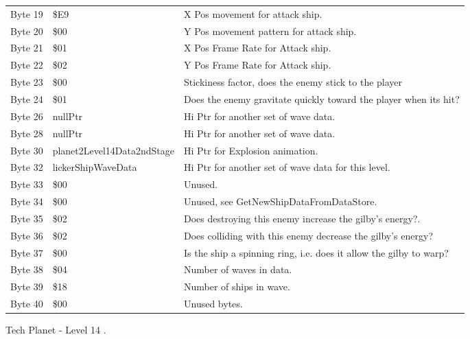 \begin{figure}[H]
{\begin{adjustbox}{width=12cm}
\begin{tabular}{lll}
 Byte 19 & \$E9                        & X Pos movement for attack ship.                                    \\
 Byte 20 & \$00                        & Y Pos movement pattern for attack ship.                            \\
 Byte 21 & \$01                        & X Pos Frame Rate for Attack ship.                                  \\
 Byte 22 & \$02                        & Y Pos Frame Rate for Attack ship.                                  \\
 Byte 23 & \$00                        & Stickiness factor, does the enemy stick to the player              \\
 Byte 24 & \$01                        & Does the enemy gravitate quickly toward the player when its hit?   \\
 Byte 26 & nullPtr                    & Hi Ptr for another set of wave data.                               \\
 Byte 28 & nullPtr                    & Hi Ptr for another set of wave data.                               \\
 Byte 30 & planet2Level14Data2ndStage & Hi Ptr for Explosion animation.                                    \\
 Byte 32 & lickerShipWaveData         & Hi Ptr for another set of wave data for this level.                \\
 Byte 33 & \$00                        & Unused.                                                            \\
 Byte 34 & \$00                        & Unused, see GetNewShipDataFromDataStore.                           \\
 Byte 35 & \$02                        & Does destroying this enemy increase the gilby's energy?.           \\
 Byte 36 & \$02                        & Does colliding with this enemy decrease the gilby's energy?        \\
 Byte 37 & \$00                        & Is the ship a spinning ring, i.e. does it allow the gilby to warp? \\
 Byte 38 & \$04                        & Number of waves in data.                                           \\
 Byte 39 & \$18                        & Number of ships in wave.                                           \\
 Byte 40 & \$00                        & Unused bytes.                                                      \\
\bottomrule
\end{tabular}

  \end{adjustbox}

  }\caption*{Tech Planet - Level 14
.}
\end{figure}

